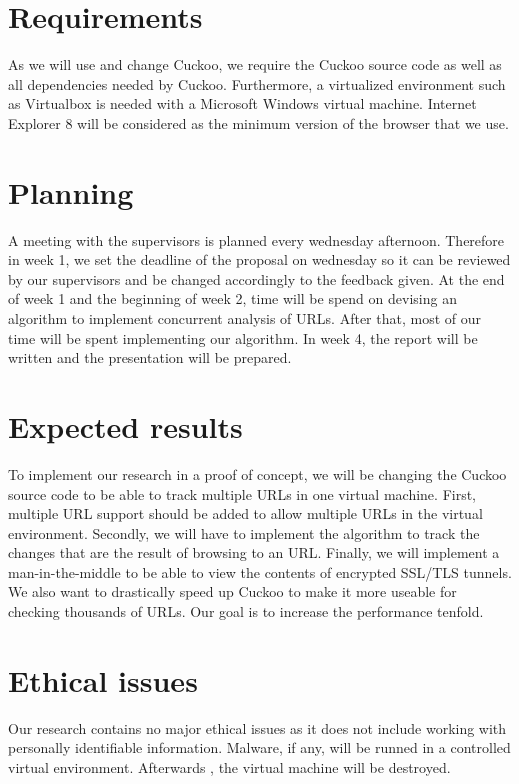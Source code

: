 \documentclass{scrartcl}
\begin{document}
\section{Requirements}

As we will use and change Cuckoo, we require the Cuckoo source code as well as all dependencies needed by Cuckoo. Furthermore, a virtualized environment such as Virtualbox is needed with a Microsoft Windows virtual machine. Internet Explorer 8 will be considered as the minimum version of the browser that we use.

\section{Planning}

A meeting with the supervisors is planned every wednesday afternoon. Therefore in week 1, we set the deadline of the proposal on wednesday so it can be reviewed by our supervisors and be changed accordingly to the feedback given. At the end of week 1 and the beginning of week 2, time will be spend on devising an algorithm to implement concurrent analysis of URLs. After that, most of our time will be spent implementing our algorithm. In week 4, the report will be written and the presentation will be prepared.

\section{Expected results}

To implement our research in a proof of concept, we will be changing the Cuckoo source code to be able to track multiple URLs in one virtual machine. First, multiple URL support should be added to allow multiple URLs in the virtual environment. Secondly, we will have to implement the algorithm to track the changes that are the result of browsing to an URL. Finally, we will implement a man-in-the-middle to be able to view the contents of encrypted SSL/TLS tunnels.\\

We also want to drastically speed up Cuckoo to make it more useable for checking thousands of URLs. Our goal is to increase the performance tenfold.

\section{Ethical issues}

Our research contains no major ethical issues as it does not include working with personally identifiable information. Malware, if any, will be runned in a controlled virtual environment. Afterwards , the virtual machine will be destroyed.



\end{document}

